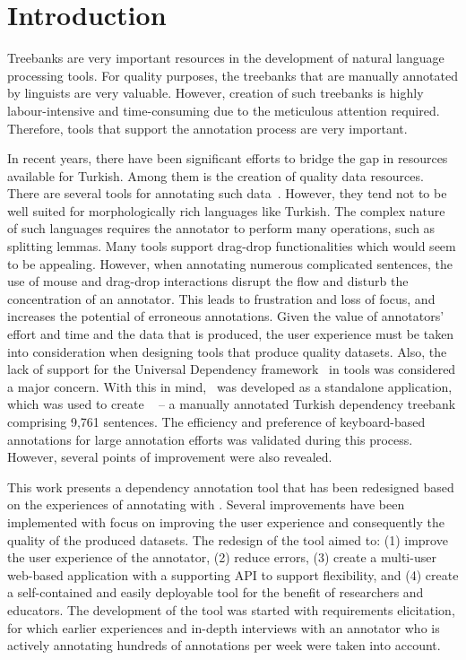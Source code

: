 \section{Introduction}
\label{sec:introduction}

Treebanks are very important resources in the development of natural language processing tools.
For quality purposes, the treebanks that are manually annotated by linguists are very valuable. 
However, creation of such treebanks is highly labour-intensive and time-consuming due to the meticulous attention required.
Therefore, tools that support the annotation process are very important. 

In recent years, there have been significant efforts to bridge the gap in resources available for Turkish. 
Among them is the creation of quality data resources. 
There are several tools for annotating such data~\cite{brat,dgannotator}. 
However, they tend not to be well suited for morphologically rich languages like Turkish.
The complex nature of such languages requires the annotator to perform many operations, such as splitting lemmas.
Many tools support drag-drop functionalities which would seem to be appealing. 
However, when annotating numerous complicated sentences, the use of mouse and drag-drop interactions disrupt the flow and disturb the concentration of an annotator. 
This leads to frustration and loss of focus, and increases the potential of erroneous annotations.
Given the value of annotators' effort and time and the data that is produced, the user experience must be taken into consideration when designing tools that produce quality datasets. 
Also, the lack of support for the Universal Dependency framework~\cite{UD} in tools was considered a major concern.
With this in mind, \boatvone\ was developed as a standalone application, which was used to create \bountreebank~\cite{turk-etal-2019-turkish,trk2020resources,UD-Boun-Treebank} -- a manually annotated Turkish dependency treebank comprising 9,761 sentences.
The efficiency and preference of keyboard-based annotations for large annotation efforts was validated during this process. 
However, several points of improvement were also revealed.  

This work presents a dependency annotation tool that has been redesigned based on the experiences of annotating with \boatvone.
Several improvements have been implemented with focus on improving the user experience and consequently the quality of the produced datasets.
The redesign of the tool aimed to: (1) improve the user experience of the annotator, (2) reduce errors, (3) create a multi-user web-based application with a supporting API to support flexibility, and (4) create a self-contained and easily deployable tool for the benefit of researchers and educators. 
The development of the tool was started with requirements elicitation, for which earlier experiences and in-depth interviews with an annotator who is actively annotating hundreds of annotations per week were taken into account.

